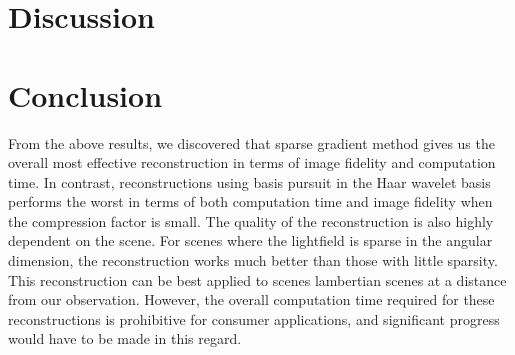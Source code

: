 \documentclass[10pt,twocolumn,letterpaper]{article}
\begin{document}
\section{Discussion}


\section{Conclusion}

From the above results, we discovered that sparse gradient method gives us the overall most effective reconstruction in terms of image fidelity and computation time. In contrast, reconstructions using basis pursuit in the Haar wavelet basis performs the worst in terms of both computation time and image fidelity when the compression factor is small. The quality of the reconstruction is also highly dependent on the scene. For scenes where the lightfield is sparse in the angular dimension, the reconstruction works much better than those with little sparsity. This reconstruction can be best applied to scenes lambertian scenes at a distance from our observation. However, the overall computation time required for these reconstructions is prohibitive for consumer applications, and significant progress would have to be made in this regard. 

{\small


}
\end{document}
